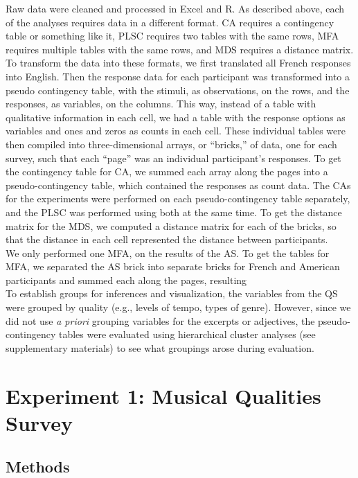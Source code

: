 \documentclass[
  english,
  man,floatsintext]{apa6}
\begin{document}
Raw data were cleaned and processed in Excel and R. As described above, each of the analyses requires data in a different format. CA requires a contingency table or something like it, PLSC requires two tables with the same rows, MFA requires multiple tables with the same rows, and MDS requires a distance matrix.
To transform the data into these formats, we first translated all French responses into English. Then the response data for each participant was transformed into a pseudo contingency table, with the stimuli, as observations, on the rows, and the responses, as variables, on the columns. This way, instead of a table with qualitative information in each cell, we had a table with the response options as variables and ones and zeros as counts in each cell. These individual tables were then compiled into three-dimensional arrays, or ``bricks,'' of data, one for each survey, such that each ``page'' was an individual participant's responses.
To get the contingency table for CA, we summed each array along the pages into a pseudo-contingency table, which contained the responses as count data. The CAs for the experiments were performed on each pseudo-contingency table separately, and the PLSC was performed using both at the same time.
To get the distance matrix for the MDS, we computed a distance matrix for each of the bricks, so that the distance in each cell represented the distance between participants.\\
We only performed one MFA, on the results of the AS. To get the tables for MFA, we separated the AS brick into separate bricks for French and American participants and summed each along the pages, resulting\\
To establish groups for inferences and visualization, the variables from the QS were grouped by quality (e.g., levels of tempo, types of genre). However, since we did not use \emph{a priori} grouping variables for the excerpts or adjectives, the pseudo-contingency tables were evaluated using hierarchical cluster analyses (see supplementary materials) to see what groupings arose during evaluation.

\hypertarget{experiment-1-musical-qualities-survey}{%
\section{Experiment 1: Musical Qualities Survey}\label{experiment-1-musical-qualities-survey}}

\hypertarget{methods}{%
\subsection{Methods}\label{methods}}
\end{document}
